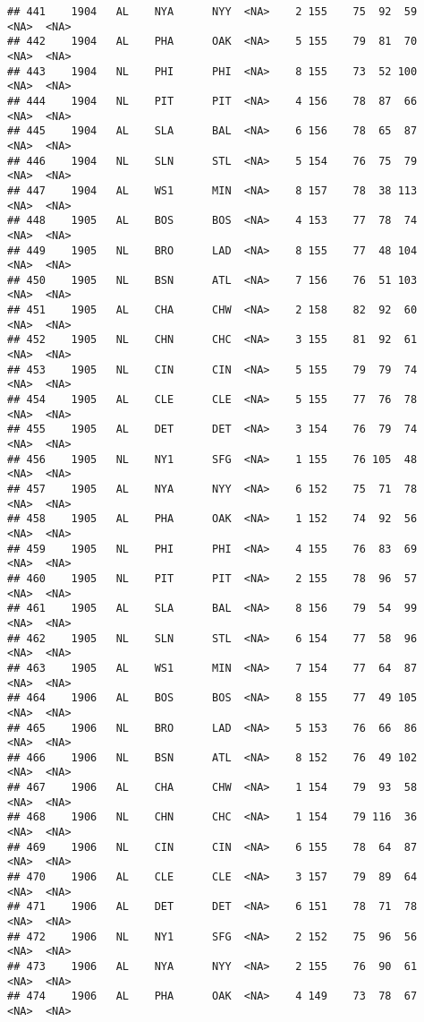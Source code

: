\documentclass[]{article}
\begin{document}
\begin{verbatim}
## 441    1904   AL    NYA      NYY  <NA>    2 155    75  92  59   <NA>  <NA>
## 442    1904   AL    PHA      OAK  <NA>    5 155    79  81  70   <NA>  <NA>
## 443    1904   NL    PHI      PHI  <NA>    8 155    73  52 100   <NA>  <NA>
## 444    1904   NL    PIT      PIT  <NA>    4 156    78  87  66   <NA>  <NA>
## 445    1904   AL    SLA      BAL  <NA>    6 156    78  65  87   <NA>  <NA>
## 446    1904   NL    SLN      STL  <NA>    5 154    76  75  79   <NA>  <NA>
## 447    1904   AL    WS1      MIN  <NA>    8 157    78  38 113   <NA>  <NA>
## 448    1905   AL    BOS      BOS  <NA>    4 153    77  78  74   <NA>  <NA>
## 449    1905   NL    BRO      LAD  <NA>    8 155    77  48 104   <NA>  <NA>
## 450    1905   NL    BSN      ATL  <NA>    7 156    76  51 103   <NA>  <NA>
## 451    1905   AL    CHA      CHW  <NA>    2 158    82  92  60   <NA>  <NA>
## 452    1905   NL    CHN      CHC  <NA>    3 155    81  92  61   <NA>  <NA>
## 453    1905   NL    CIN      CIN  <NA>    5 155    79  79  74   <NA>  <NA>
## 454    1905   AL    CLE      CLE  <NA>    5 155    77  76  78   <NA>  <NA>
## 455    1905   AL    DET      DET  <NA>    3 154    76  79  74   <NA>  <NA>
## 456    1905   NL    NY1      SFG  <NA>    1 155    76 105  48   <NA>  <NA>
## 457    1905   AL    NYA      NYY  <NA>    6 152    75  71  78   <NA>  <NA>
## 458    1905   AL    PHA      OAK  <NA>    1 152    74  92  56   <NA>  <NA>
## 459    1905   NL    PHI      PHI  <NA>    4 155    76  83  69   <NA>  <NA>
## 460    1905   NL    PIT      PIT  <NA>    2 155    78  96  57   <NA>  <NA>
## 461    1905   AL    SLA      BAL  <NA>    8 156    79  54  99   <NA>  <NA>
## 462    1905   NL    SLN      STL  <NA>    6 154    77  58  96   <NA>  <NA>
## 463    1905   AL    WS1      MIN  <NA>    7 154    77  64  87   <NA>  <NA>
## 464    1906   AL    BOS      BOS  <NA>    8 155    77  49 105   <NA>  <NA>
## 465    1906   NL    BRO      LAD  <NA>    5 153    76  66  86   <NA>  <NA>
## 466    1906   NL    BSN      ATL  <NA>    8 152    76  49 102   <NA>  <NA>
## 467    1906   AL    CHA      CHW  <NA>    1 154    79  93  58   <NA>  <NA>
## 468    1906   NL    CHN      CHC  <NA>    1 154    79 116  36   <NA>  <NA>
## 469    1906   NL    CIN      CIN  <NA>    6 155    78  64  87   <NA>  <NA>
## 470    1906   AL    CLE      CLE  <NA>    3 157    79  89  64   <NA>  <NA>
## 471    1906   AL    DET      DET  <NA>    6 151    78  71  78   <NA>  <NA>
## 472    1906   NL    NY1      SFG  <NA>    2 152    75  96  56   <NA>  <NA>
## 473    1906   AL    NYA      NYY  <NA>    2 155    76  90  61   <NA>  <NA>
## 474    1906   AL    PHA      OAK  <NA>    4 149    73  78  67   <NA>  <NA>

\end{verbatim}
\end{document}
